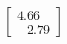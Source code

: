 \documentclass[preview]{standalone}
\begin{document}
\begin{align*}
\begin{bmatrix} 4.66 \\ -2.79 \end{bmatrix}
\end{align*}
\end{document}
